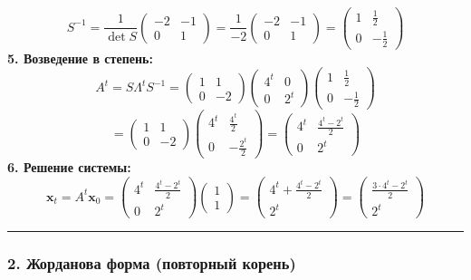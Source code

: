 $$S^{-1} = \frac{1}{\det S}\begin{pmatrix} -2 & -1 \\ 0 & 1 \end{pmatrix} = \frac{1}{-2}\begin{pmatrix} -2 & -1 \\ 0 & 1 \end{pmatrix} = \begin{pmatrix} 1 & \frac{1}{2} \\ 0 & -\frac{1}{2} \end{pmatrix}$$
\textbf{5. Возведение в степень:}
$$A^t = S\Lambda^t S^{-1} = \begin{pmatrix} 1 & 1 \\ 0 & -2 \end{pmatrix}\begin{pmatrix} 4^t & 0 \\ 0 & 2^t \end{pmatrix}\begin{pmatrix} 1 & \frac{1}{2} \\ 0 & -\frac{1}{2} \end{pmatrix}$$
$$= \begin{pmatrix} 1 & 1 \\ 0 & -2 \end{pmatrix}\begin{pmatrix} 4^t & \frac{4^t}{2} \\ 0 & -\frac{2^t}{2} \end{pmatrix} = \begin{pmatrix} 4^t & \frac{4^t - 2^t}{2} \\ 0 & 2^t \end{pmatrix}$$
\textbf{6. Решение системы:}
$$\mathbf{x}_t = A^t\mathbf{x}_0 = \begin{pmatrix} 4^t & \frac{4^t - 2^t}{2} \\ 0 & 2^t \end{pmatrix}\begin{pmatrix} 1 \\ 1 \end{pmatrix} = \begin{pmatrix} 4^t + \frac{4^t - 2^t}{2} \\ 2^t \end{pmatrix} = \begin{pmatrix} \frac{3 \cdot 4^t - 2^t}{2} \\ 2^t \end{pmatrix}$$

\bigskip
\hrule
\bigskip

\subsubsection*{2. Жорданова форма (повторный корень)}

